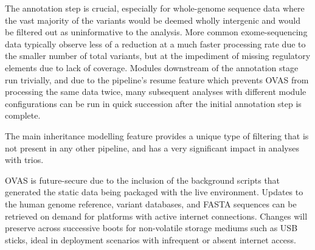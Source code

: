 \documentclass[twocolumn]{bmcart}%
\def\app{OVAS}
\newcounter{changeCount}
\newcommand{\changes}[1]{
		\stepcounter{changeCount}
		{\tiny\bf\color{violet}\arabic{changeCount}}
		{\color{red} #1}
	}
\newcommand{\changes}[1]{#1}
\begin{document}
The annotation step is crucial, especially for whole-genome sequence data where the vast majority of the variants would be deemed wholly intergenic and would be filtered out as uninformative to the analysis. More common exome-sequencing data typically observe less of a reduction at a much faster processing rate due to the smaller number of total variants, but at the impediment of missing regulatory elements due to lack of coverage. Modules downstream of the annotation stage run trivially, and due to the pipeline's resume feature which prevents \app{} from processing the same data twice, many subsequent analyses with different module configurations can be run in quick succession after the initial annotation step is complete.

\changes{The main inheritance modelling feature provides a unique type of filtering that is not present in any other pipeline, and has a very significant impact in analyses with trios.}

\app{} is future-secure due to the inclusion of the background scripts that generated the static data being packaged with the live environment. Updates to the human genome reference, variant databases, and FASTA sequences can be retrieved on demand for platforms with active internet connections. Changes will preserve across successive boots for non-volatile storage mediums such as USB sticks, ideal in deployment scenarios with infrequent or absent internet access.


\end{document}

